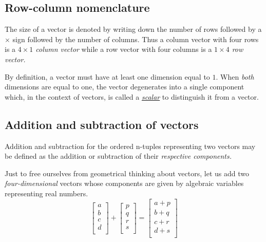 \documentclass[
  a4paper,
]{article}
\begin{document}
\hypertarget{row-column-nomenclature}{%
\subsection{Row-column nomenclature}\label{row-column-nomenclature}}

The size of a vector is denoted by writing down the number of rows
followed by a \(\times\) sign followed by the number of columns. Thus a
column vector with four rows is a \emph{\(4 \times 1\) column vector}
while a row vector with four columns is a \emph{\(1 \times 4\) row
vector.}

By definition, a vector must have at least one dimension equal to \(1\).
When \emph{both} dimensions are equal to one, the vector degenerates
into a single component which, in the context of vectors, is called a
\href{http://en.wikipedia.org/wiki/Scalar_\%28mathematics\%29}{\emph{scalar}}
to distinguish it from a vector.

\hypertarget{addition-and-subtraction-of-vectors}{%
\subsection{Addition and subtraction of
vectors}\label{addition-and-subtraction-of-vectors}}

Addition and subtraction for the ordered n-tuples representing two
vectors may be defined as the addition or subtraction of their
\emph{respective components.}

Just to free ourselves from geometrical thinking about vectors, let us
add two \emph{four-dimensional} vectors whose components are given by
algebraic variables representing real numbers. \[
\begin{bmatrix}a\\b\\c\\d\\\end{bmatrix} + \begin{bmatrix}p\\q\\r\\s\\\end{bmatrix} = \begin{bmatrix}a+p\\b+q\\c+r\\d+s\\\end{bmatrix}
\]
\end{document}
